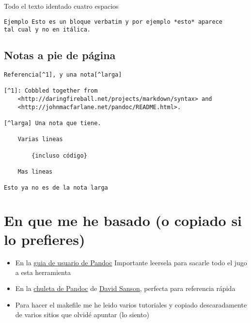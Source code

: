 \documentclass[
  12pt,
  spanish,
]{article}
\providecommand{\tightlist}{%
  \setlength{\itemsep}{0pt}\setlength{\parskip}{0pt}}
\begin{document}
Todo el texto identado cuatro espacios

\begin{verbatim}
Ejemplo Esto es un bloque verbatim y por ejemplo *esto* aparece
tal cual y no en itálica.
\end{verbatim}

\hypertarget{notas-a-pie-de-puxe1gina}{%
\subsection{Notas a pie de página}\label{notas-a-pie-de-puxe1gina}}

\begin{verbatim}
Referencia[^1], y una nota[^larga]

[^1]: Cobbled together from
    <http://daringfireball.net/projects/markdown/syntax> and
    <http://johnmacfarlane.net/pandoc/README.html>.
    
[^larga] Una nota que tiene.

    Varias lineas
    
        {incluso código}
    
    Mas lineas
    
Esto ya no es de la nota larga
\end{verbatim}

\hypertarget{en-que-me-he-basado-o-copiado-si-lo-prefieres}{%
\section{En que me he basado (o copiado si lo
prefieres)}\label{en-que-me-he-basado-o-copiado-si-lo-prefieres}}

\begin{itemize}
\tightlist
\item
  En la \href{http://pandoc.org/README.html}{guia de usuario de Pandoc}
  Importante leersela para sacarle todo el jugo a esta herramienta
\item
  En la
  \href{https://github.com/dsanson/Pandoc.tmbundle/blob/master/Support/doc/cheatsheet.markdown}{chuleta
  de Pandoc} de \href{https://github.com/dsanson}{David Sanson},
  perfecta para referencia rápida
\item
  Para hacer el makefile me he leido varios tutoriales y copiado
  descaradamente de varios sitios que olvidé apuntar (lo siento)
\end{itemize}
\end{document}
